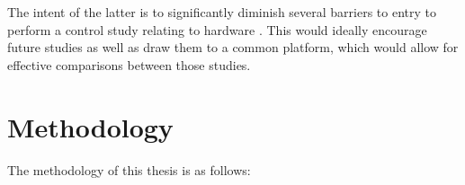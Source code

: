 \documentclass[crop=false,float=true,class=scrreprt]{standalone}
\begin{document}
The intent of the latter is to significantly diminish
several barriers to entry to perform a control study relating to hardware 
{\fns{}}.
This would ideally encourage future studies 
as well as draw them to a common platform,
which would allow for effective comparisons between those studies.




\clearpage




\section{Methodology}

The methodology of this thesis is as follows:
\end{document}
